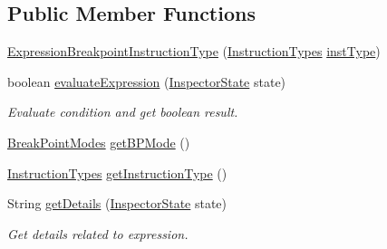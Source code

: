 \subsection*{Public Member Functions}
\begin{DoxyCompactItemize}
\item 
\hyperlink{classgov_1_1nasa_1_1jpf_1_1inspector_1_1server_1_1expression_1_1expressions_1_1_expression_breakpoint_instruction_type_aca9be4750f60c7396b0fe25b501aa737}{Expression\+Breakpoint\+Instruction\+Type} (\hyperlink{enumgov_1_1nasa_1_1jpf_1_1inspector_1_1interfaces_1_1_instruction_types}{Instruction\+Types} \hyperlink{classgov_1_1nasa_1_1jpf_1_1inspector_1_1server_1_1expression_1_1expressions_1_1_expression_breakpoint_instruction_type_a7343e1115cf9f4681a33d86bd05721c4}{inst\+Type})
\item 
boolean \hyperlink{classgov_1_1nasa_1_1jpf_1_1inspector_1_1server_1_1expression_1_1expressions_1_1_expression_breakpoint_instruction_type_a9143d6d205ca4394e59439cef8a8cede}{evaluate\+Expression} (\hyperlink{interfacegov_1_1nasa_1_1jpf_1_1inspector_1_1server_1_1expression_1_1_inspector_state}{Inspector\+State} state)
\begin{DoxyCompactList}\small\item\em Evaluate condition and get boolean result. \end{DoxyCompactList}\item 
\hyperlink{enumgov_1_1nasa_1_1jpf_1_1inspector_1_1server_1_1breakpoints_1_1_break_point_modes}{Break\+Point\+Modes} \hyperlink{classgov_1_1nasa_1_1jpf_1_1inspector_1_1server_1_1expression_1_1expressions_1_1_expression_breakpoint_instruction_type_aefb559d1692a086952cd87a970297867}{get\+B\+P\+Mode} ()
\item 
\hyperlink{enumgov_1_1nasa_1_1jpf_1_1inspector_1_1interfaces_1_1_instruction_types}{Instruction\+Types} \hyperlink{classgov_1_1nasa_1_1jpf_1_1inspector_1_1server_1_1expression_1_1expressions_1_1_expression_breakpoint_instruction_type_a47dd29bf0a923ee9bdb558b5c6b6bf77}{get\+Instruction\+Type} ()
\item 
String \hyperlink{classgov_1_1nasa_1_1jpf_1_1inspector_1_1server_1_1expression_1_1expressions_1_1_expression_breakpoint_instruction_type_a544b5bdaece524b8657bdc5977cea97c}{get\+Details} (\hyperlink{interfacegov_1_1nasa_1_1jpf_1_1inspector_1_1server_1_1expression_1_1_inspector_state}{Inspector\+State} state)
\begin{DoxyCompactList}\small\item\em Get details related to expression. \end{DoxyCompactList}\item 

\end{DoxyCompactItemize}

